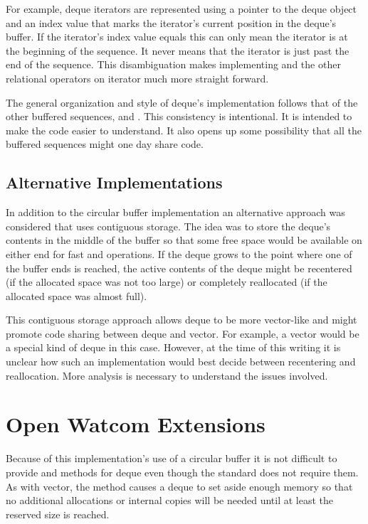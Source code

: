 For example, deque iterators are represented using a pointer to the deque
object and an index value that marks the iterator's current position in the
deque's buffer. If the iterator's index value equals  this
can only mean the iterator is at the beginning of the sequence. It never means
that the iterator is just past the end of the sequence. This disambiguation
makes implementing  and the other relational operators on
iterator much more straight forward.

The general organization and style of deque's implementation follows that of
the other buffered sequences,  and . This
consistency is intentional. It is intended to make the  code
easier to understand. It also opens up some possibility that all the buffered
sequences might one day share code.

\subsection{Alternative Implementations}

In addition to the circular buffer implementation an alternative approach was
considered that uses contiguous storage. The idea was to store the deque's
contents in the middle of the buffer so that some free space would be
available on either end for fast  and 
operations. If the deque grows to the point where one of the buffer ends is
reached, the active contents of the deque might be recentered (if the
allocated space was not too large) or completely reallocated (if the allocated
space was almost full).

This contiguous storage approach allows deque to be more vector-like and might
promote code sharing between deque and vector. For example, a vector would be a
special kind of deque in this case. However, at the time of this writing it is
unclear how such an implementation would best decide between recentering and
reallocation. More analysis is necessary to understand the issues involved.

\section{Open Watcom Extensions}

Because of this implementation's use of a circular buffer it is not difficult
to provide  and  methods for deque even though
the standard does not require them. As with vector, the  method
causes a deque to set aside enough memory so that no additional allocations or
internal copies will be needed until at least the reserved size is reached.

